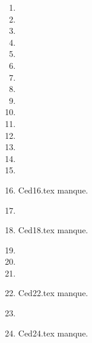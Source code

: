 \begin{enumerate}
  \item  
  \item  
  \item  
  \item  
  \item  
  \item  
  \item  
  \item  
  \item  
  \item  
  \item  
  \item  
  \item  
  \item  
  \item  
  \item Ced16.tex manque. 
  \item  
  \item Ced18.tex manque. 
  \item  
  \item  
  \item  
  \item Ced22.tex manque. 
  \item  
  \item Ced24.tex manque. 
\end{enumerate} 
